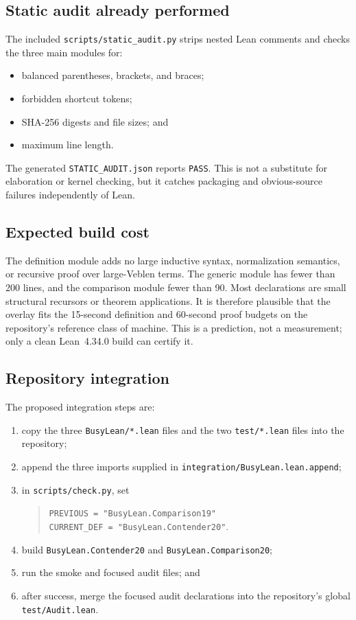 \documentclass[11pt]{article}
\theoremstyle{definition}
\theoremstyle{remark}
\newcommand{\code}[1]{\texttt{#1}}
\begin{document}
\subsection{Static audit already performed}

The included \code{scripts/static\_audit.py} strips nested Lean comments and
checks the three main modules for:
\begin{itemize}[leftmargin=*]
\item balanced parentheses, brackets, and braces;
\item forbidden shortcut tokens;
\item SHA-256 digests and file sizes; and
\item maximum line length.
\end{itemize}
The generated \code{STATIC\_AUDIT.json} reports \code{PASS}.  This is not a
substitute for elaboration or kernel checking, but it catches packaging and
obvious-source failures independently of Lean.

\subsection{Expected build cost}

The definition module adds no large inductive syntax, normalization semantics,
or recursive proof over large-Veblen terms.  The generic module has fewer than
200 lines, and the comparison module fewer than 90.  Most declarations are
small structural recursors or theorem applications.  It is therefore plausible
that the overlay fits the 15-second definition and 60-second proof budgets on
the repository's reference class of machine.  This is a prediction, not a
measurement; only a clean Lean~4.34.0 build can certify it.

\subsection{Repository integration}

The proposed integration steps are:
\begin{enumerate}[leftmargin=*]
\item copy the three \code{BusyLean/*.lean} files and the two \code{test/*.lean}
  files into the repository;
\item append the three imports supplied in
  \code{integration/BusyLean.lean.append};
\item in \code{scripts/check.py}, set
  \begin{quote}\small
  \code{PREVIOUS = "BusyLean.Comparison19"}\\
  \code{CURRENT\_DEF = "BusyLean.Contender20"}.
  \end{quote}
\item build \code{BusyLean.Contender20} and
  \code{BusyLean.Comparison20};
\item run the smoke and focused audit files; and
\item after success, merge the focused audit declarations into the repository's
  global \code{test/Audit.lean}.
\end{enumerate}
\end{document}

